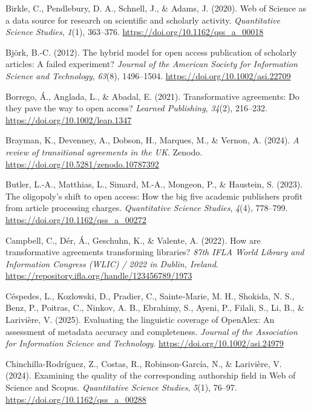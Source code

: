 \documentclass[a4paper,man,floatsintext,longtable,noextraspace,10pt]{apa6}
\newlength{\cslhangindent}
\newenvironment{CSLReferences}[2] %
{\begin{list}{}{%
  \setlength{\itemindent}{0pt}
  \setlength{\leftmargin}{0pt}
  \setlength{\parsep}{0pt}
  \ifodd #1
  \setlength{\leftmargin}{\cslhangindent}
  \setlength{\itemindent}{-1\cslhangindent}
  \fi
  \setlength{\itemsep}{#2\baselineskip}}}
{\end{list}}
\begin{document}
\begin{CSLReferences}{1}{0}
Birkle, C., Pendlebury, D. A., Schnell, J., \& Adams, J. (2020). {Web of
Science} as a data source for research on scientific and scholarly
activity. \emph{Quantitative Science Studies}, \emph{1}(1), 363--376.
\url{https://doi.org/10.1162/qss_a_00018}

Björk, B.-C. (2012). The hybrid model for open access publication of
scholarly articles: A failed experiment? \emph{Journal of the American
Society for Information Science and Technology}, \emph{63}(8),
1496--1504. \url{https://doi.org/10.1002/asi.22709}

Borrego, Á., Anglada, L., \& Abadal, E. (2021). Transformative
agreements: Do they pave the way to open access? \emph{Learned
Publishing}, \emph{34}(2), 216--232.
\url{https://doi.org/10.1002/leap.1347}

Brayman, K., Devenney, A., Dobson, H., Marques, M., \& Vernon, A.
(2024). \emph{A review of transitional agreements in the {UK}}. Zenodo.
\url{https://doi.org/10.5281/zenodo.10787392}

Butler, L.-A., Matthias, L., Simard, M.-A., Mongeon, P., \& Haustein, S.
(2023). The oligopoly's shift to open access: How the big five academic
publishers profit from article processing charges. \emph{Quantitative
Science Studies}, \emph{4}(4), 778--799.
\url{https://doi.org/10.1162/qss_a_00272}

Campbell, C., Dér, Á., Geschuhn, K., \& Valente, A. (2022). How are
transformative agreements transforming libraries? \emph{87th IFLA World
Library and Information Congress (WLIC) / 2022 in Dublin, Ireland}.
\url{https://repository.ifla.org/handle/123456789/1973}

Céspedes, L., Kozlowski, D., Pradier, C., Sainte‐Marie, M. H., Shokida,
N. S., Benz, P., Poitras, C., Ninkov, A. B., Ebrahimy, S., Ayeni, P.,
Filali, S., Li, B., \& Larivière, V. (2025). Evaluating the linguistic
coverage of {OpenAlex}: An assessment of metadata accuracy and
completeness. \emph{Journal of the Association for Information Science
and Technology}. \url{https://doi.org/10.1002/asi.24979}

Chinchilla-Rodríguez, Z., Costas, R., Robinson-García, N., \& Larivière,
V. (2024). Examining the quality of the corresponding authorship field
in {Web of Science} and {Scopus}. \emph{Quantitative Science Studies},
\emph{5}(1), 76--97. \url{https://doi.org/10.1162/qss_a_00288}


\end{CSLReferences}
\end{document}
